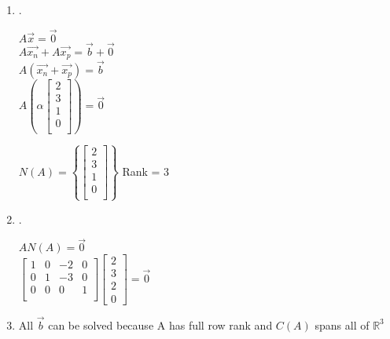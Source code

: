 
\begin{enumerate}[label=(\alph*)]
    \item .\\
    \begin{center}
        $A\Vec{x} = \Vec{0}$ \\
        $A \Vec{x_n}+A \Vec{x_p} = \Vec{b} + \Vec{0}$ \\
        $A(\Vec{x_n} + \Vec{x_p})=\Vec{b}$ \\
        $A\left( \alpha 
        \begin{bmatrix} 
            2 \\
            3 \\
            1 \\
            0 \\
        \end{bmatrix} \right) = \Vec{0}$
        
        $N(A) = \left\{ \begin{bmatrix} 
            2 \\
            3 \\
            1 \\
            0 \\
        \end{bmatrix} \right\} $
        Rank = 3
    \end{center}
    \item .\\
    \begin{center}
        $AN(A)=\Vec{0}$ \\
        $\begin{bmatrix}
            1 & 0 & -2 & 0 \\
            0 & 1 & -3 & 0 \\
            0 & 0 & 0 & 1 \\
        \end{bmatrix}
        \begin{bmatrix}
            2 \\ 3 \\ 2 \\ 0
        \end{bmatrix}
        = \Vec{0}$
    \end{center}
    \item All $\Vec{b}$ can be solved because A has full row rank and $C(A)$ spans all of $\mathbb{R}^3$
\end{enumerate}